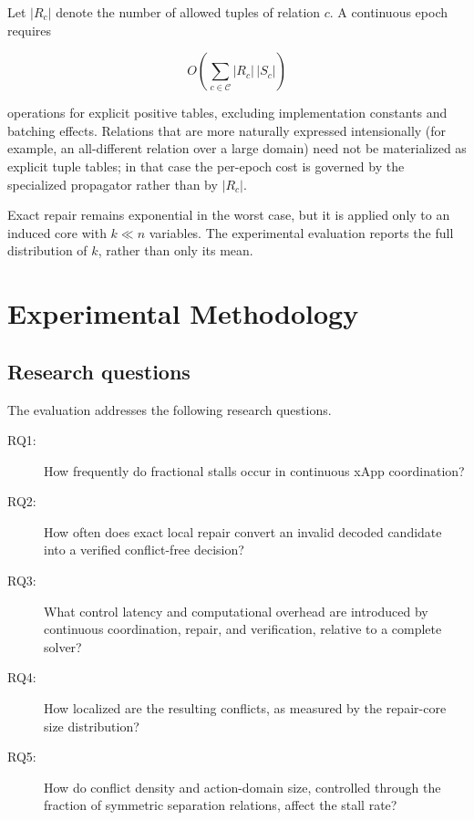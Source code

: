 \documentclass[pdflatex,sn-mathphys-num,iicol,oneside]{sn-jnl}
\begin{document}
Let $|R_c|$ denote the number of allowed tuples of relation $c$. A
continuous epoch requires

\begin{equation}
O\left(
\sum_{c\in\mathcal{C}} |R_c|\,|S_c|
\right)
\end{equation}

operations for explicit positive tables, excluding implementation
constants and batching effects. Relations that are more naturally
expressed intensionally (for example, an all-different relation over a
large domain) need not be materialized as explicit tuple tables; in
that case the per-epoch cost is governed by the specialized
propagator rather than by $|R_c|$.

Exact repair remains exponential in the worst case, but it is applied
only to an induced core with $k\ll n$ variables. The experimental
evaluation reports the full distribution of $k$, rather than only its
mean.

\section{Experimental Methodology}
\label{sec:experiments}

\subsection{Research questions}

The evaluation addresses the following research questions.

\begin{description}
    \item[RQ1:] How frequently do fractional stalls occur in
    continuous xApp coordination?

    \item[RQ2:] How often does exact local repair convert an invalid
    decoded candidate into a verified conflict-free decision?

    \item[RQ3:] What control latency and computational overhead are
    introduced by continuous coordination, repair, and verification,
    relative to a complete solver?

    \item[RQ4:] How localized are the resulting conflicts, as measured
    by the repair-core size distribution?

    \item[RQ5:] How do conflict density and action-domain size,
    controlled through the fraction of symmetric separation relations,
    affect the stall rate?
\end{description}
\end{document}
